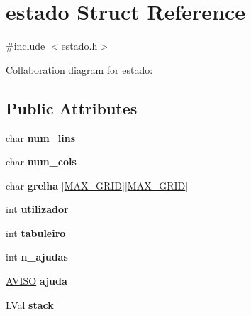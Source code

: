 \hypertarget{structestado}{\section{estado Struct Reference}
\label{structestado}
}


{\ttfamily \#include $<$estado.\+h$>$}



Collaboration diagram for estado\+:
\subsection*{Public Attributes}
\begin{DoxyCompactItemize}
\item 
\hypertarget{structestado_ad19bdc6f740e859b32842b985d4871de}{char {\bfseries num\+\_\+lins}}\label{structestado_ad19bdc6f740e859b32842b985d4871de}

\item 
\hypertarget{structestado_a1a110cae8b3c47549ee993413cccc4a3}{char {\bfseries num\+\_\+cols}}\label{structestado_a1a110cae8b3c47549ee993413cccc4a3}

\item 
\hypertarget{structestado_a7d72f243f07d0d277f24e15e28a9a7b2}{char {\bfseries grelha} \mbox{[}\hyperlink{estado_8h_ab02e1c5c6948bf8cf3c21a0acad8a578}{M\+A\+X\+\_\+\+G\+R\+I\+D}\mbox{]}\mbox{[}\hyperlink{estado_8h_ab02e1c5c6948bf8cf3c21a0acad8a578}{M\+A\+X\+\_\+\+G\+R\+I\+D}\mbox{]}}\label{structestado_a7d72f243f07d0d277f24e15e28a9a7b2}

\item 
\hypertarget{structestado_ac70a7cc5db84a8500d743898bf978cdb}{int {\bfseries utilizador}}\label{structestado_ac70a7cc5db84a8500d743898bf978cdb}

\item 
\hypertarget{structestado_a915897f69eb553f9ef740a3fa9d68876}{int {\bfseries tabuleiro}}\label{structestado_a915897f69eb553f9ef740a3fa9d68876}

\item 
\hypertarget{structestado_a34766082baf730fe8565309a9690ee6d}{int {\bfseries n\+\_\+ajudas}}\label{structestado_a34766082baf730fe8565309a9690ee6d}

\item 
\hypertarget{structestado_a37f9b2e05549d3883b8df3b25f8ee154}{\hyperlink{estado_8h_a985e6d3fc31cc302b5898fa14846efe8}{A\+V\+I\+S\+O} {\bfseries ajuda}}\label{structestado_a37f9b2e05549d3883b8df3b25f8ee154}

\item 
\hypertarget{structestado_a7765fd7e66c2eaeb54d2913fa1e36c8f}{\hyperlink{estado_8h_a6a29548da3b831560127ea1a39663399}{L\+Val} {\bfseries stack}}\label{structestado_a7765fd7e66c2eaeb54d2913fa1e36c8f}

\end{DoxyCompactItemize}


